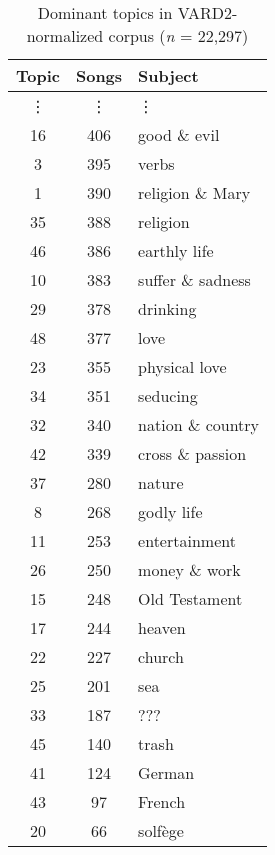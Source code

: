 \begin{table}
	\begin{minipage}{0.5\textwidth}
		\begin{tabular}{|ccl}
			\toprule
			Topic & Songs & Subject  \\
			\midrule
			\vdots & \vdots & \vdots \\						
			16             &   406 & good \& evil \\
			3              &   395 & verbs \\
			1              &   390 & religion \& Mary \\
			35             &   388 & religion \\
			46             &   386 & earthly life \\
			10             &   383 & suffer \& sadness \\
			29             &   378 & drinking \\
			48             &   377 & love \\
			23             &   355 & physical love \\
			34             &   351 & seducing \\
			32             &   340 & nation \& country \\
			42             &   339 & cross \& passion \\
			37             &   280 & nature \\
			8              &   268 & godly life \\
			11             &   253 & entertainment \\
			26             &   250 & money \& work \\
			15             &   248 & Old Testament \\
			17             &   244 & heaven \\
			22             &   227 & church \\
			25             &   201 & sea \\
			33             &   187 & ??? \\
			45             &   140 & trash \\
			41             &   124 & German \\
			43             &    97 & French \\
			20             &    66 & solfège \\
			\bottomrule
		\end{tabular}
	\end{minipage}
	\caption{Dominant topics in VARD2-normalized corpus (\textit{n} = 22,297)}
	\label{table:DomTopVARD2}
\end{table}

